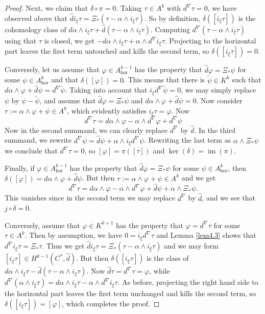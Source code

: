 \documentclass[12pt,a4paper]{amsart}
\let\phi\varphi
\renewcommand{\o}{\circ}
\newcommand{\al}{\alpha}
\newcommand{\ph}{\phi}
\newcommand{\ps}{\psi}
\newcommand{\im}{\operatorname{im}}
\newcommand{\hor}{\text{hor}}
\numberwithin{theorem}{section}
\theoremstyle{definition}
\theoremstyle{remark}
\begin{document}
\begin{proof}
Next, we claim that $\delta\o\pi=0$. Taking $\tau\in A^k$ with
$d^\nabla\tau=0$, we have observed above that $\hat d
i_\xi\tau=\Xi_*(\tau-\al\wedge i_\xi\tau)$. So by definition,
$\delta([i_\xi\tau])$ is the cohomology class of $d\al\wedge
i_\xi\tau+\hat d(\tau-\al\wedge i_\xi\tau)$. Computing
$d^\nabla(\tau-\al\wedge i_\xi\tau)$ using that $\tau$ is closed, we
get $-d\al\wedge i_\xi\tau+\al\wedge d^\nabla i_\xi\tau$. Projecting to
the horizontal part leaves the first term untouched and kills the
second term, so $\delta([i_\xi\tau])=0$.

Conversely, let us assume that $\ph\in A^{k-1}_\hor$ has the property
that $\hat d\ph=\Xi_*\ps$ for some $\ps\in A^k_\hor$ and that
$\delta([\ph])=0$. This means that there is $\tilde\ps\in K^k$ such
that $d\al\wedge \ph+\hat d\ps=d^\nabla\tilde\ps$. Taking into account
that $i_\xi d^\nabla\tilde\ps=0$, we may simply replace $\ps$ by
$\ps-\tilde\ps$, and assume that $\hat d\ph=\Xi_*\ps$ and $d\al\wedge
\ph+\hat d\ps=0$. Now consider $\tau:=\al\wedge\ph+\ps\in A^k$, which
evidently satisfies $i_\xi\tau=\ph$. Now 
$$
d^\nabla\tau=d\al\wedge\ph-\al\wedge d^\nabla\ph+d^\nabla\ps
$$
Now in the second summand, we can clearly replace $d^\nabla$ by $\hat
d$. In the third summand, we rewrite $d^\nabla\ps=\hat d\ps+\al\wedge
i_\xi d^\nabla\ps$. Rewriting the last term as $\al\wedge\Xi_*\ps$ we
conclude that $d^\nabla\tau=0$, so $[\ph]=\pi([\tau])$ and
$\ker(\delta)=\im(\pi)$.

Finally, if $\ph\in A^{k-1}_\hor$ has the property that $\hat
d\ph=\Xi_*\ps$ for some $\ps\in A^k_\hor$, then
$\delta([\ph])=d\al\wedge\ph+\hat d\ps$. But then
$\tau:=\al\wedge\ph+\ps\in A^k$ and we get 
$$
d^\nabla\tau=d\al\wedge\ph-\al\wedge d^\nabla\ph+\hat d\ps+\al\wedge
\Xi_*\ps.
$$
This vanishes since in the second term we may replace $d^\nabla$ by
$\hat d$, and we see that $j\o\delta=0$. 

Conversely, assume that $\ph\in K^{k+1}$ has the property that
$\ph=d^\nabla\tau$ for some $\tau\in A^k$. Then by assumption, we have
$0=i_\xi d^\nabla\tau$ and Lemma \ref{lem4.3} shows that $d^\nabla
i_\xi\tau=\Xi_*\tau$. Thus we get $\hat d
i_\xi\tau=\Xi_*(\tau-\al\wedge i_\xi\tau)$ and we may form
$[i_\xi\tau]\in H^{k-1}(C^*,\hat d)$. But then $\delta([i_\xi\tau])$
is the class of $d\al\wedge i_\xi\tau-\hat d(\tau-\al\wedge
i_\xi\tau)$. Now $\hat d\tau=d^\nabla\tau=\ph$, while
$d^\nabla(\al\wedge i_\xi\tau)=d\al\wedge i_\xi\tau-\al\wedge d^\nabla
i_\xi\tau$. As before, projecting the right hand side to the
horizontal part leaves the first term unchanged and kills the second
term, so $\delta([i_\xi\tau])=[\ph]$, which completes the proof.
\end{proof}
\end{document}

